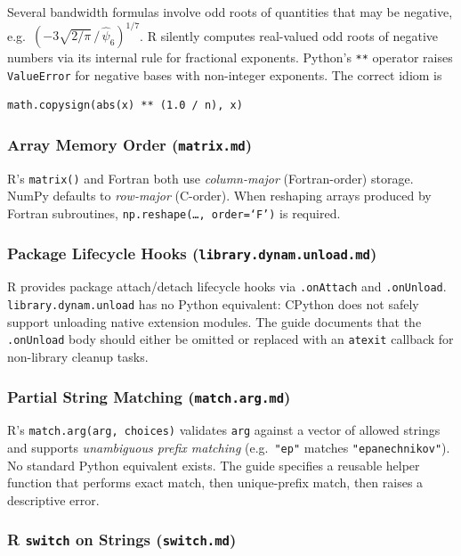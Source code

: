 \documentclass[12pt,a4paper]{article}
\begin{document}
Several bandwidth formulas involve odd roots of quantities that may be negative, e.g.\ $(-3\sqrt{2/\pi}\,/\,\hat{\psi}_6)^{1/7}$. R silently computes real-valued odd roots of negative numbers via its internal rule for fractional exponents. Python's \texttt{**} operator raises \texttt{ValueError} for negative bases with non-integer exponents. The correct idiom is
\begin{lstlisting}[style=python]
math.copysign(abs(x) ** (1.0 / n), x)
\end{lstlisting}

\subsubsection{Array Memory Order (\texttt{matrix.md})}

R's \texttt{matrix()} and Fortran both use \emph{column-major} (Fortran-order) storage. NumPy defaults to \emph{row-major} (C-order). When reshaping arrays produced by Fortran subroutines, \texttt{np.reshape(\ldots,\,order=`F')} is required.

\subsubsection{Package Lifecycle Hooks (\texttt{library.dynam.unload.md})}

R provides package attach/detach lifecycle hooks via \texttt{.onAttach} and \texttt{.onUnload}. \texttt{library.dynam.unload} has no Python equivalent: CPython does not safely support unloading native extension modules. The guide documents that the \texttt{.onUnload} body should either be omitted or replaced with an \texttt{atexit} callback for non-library cleanup tasks.

\subsubsection{Partial String Matching (\texttt{match.arg.md})}

R's \texttt{match.arg(arg, choices)} validates \texttt{arg} against a vector of allowed strings and supports \emph{unambiguous prefix matching} (e.g.\ \texttt{"ep"} matches \texttt{"epanechnikov"}). No standard Python equivalent exists. The guide specifies a reusable helper function that performs exact match, then unique-prefix match, then raises a descriptive error.

\subsubsection{R \texttt{switch} on Strings (\texttt{switch.md})}
\end{document}
